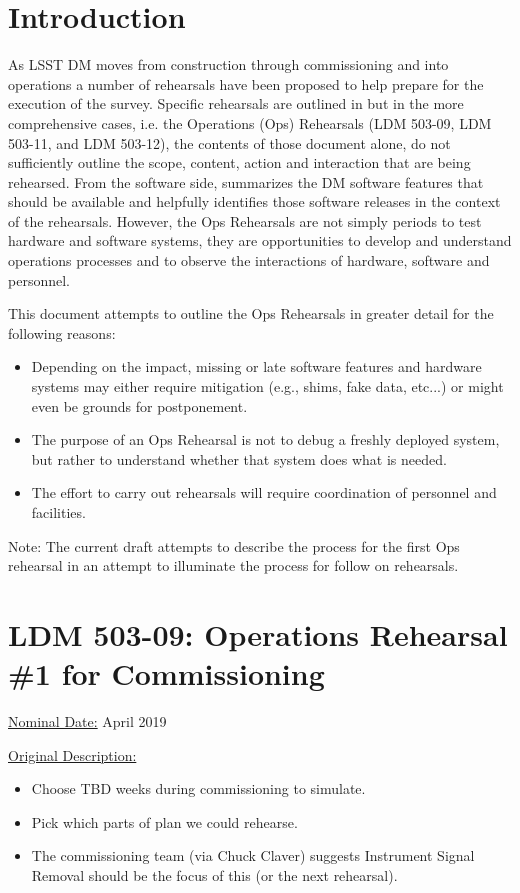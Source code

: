 
\section{Introduction}

As LSST DM moves from construction through commissioning and into operations 
a number of rehearsals have been proposed to help prepare for the execution 
of the survey.  Specific rehearsals are outlined in  but in 
the more comprehensive cases, i.e. the Operations (Ops) Rehearsals (LDM 503-09, LDM 503-11, and 
LDM 503-12), the contents of those document alone, do not sufficiently outline 
the scope, content, action and interaction that are being rehearsed.  
From the software side, 
summarizes the DM software features that should be available and helpfully 
identifies those software releases in the context of the rehearsals.  
However, the Ops Rehearsals are not simply periods to test hardware and 
software systems, they are opportunities to develop and understand operations 
processes and to observe the interactions of hardware, software and personnel.

This document attempts to outline the Ops Rehearsals in greater detail for the following reasons:
\begin{itemize}
\item Depending on the impact, missing or late software features and hardware systems may either
require mitigation (e.g., shims, fake data, etc...) or might even be grounds for 
postponement.
\item The purpose of an Ops Rehearsal is not to debug 
a freshly deployed system, but rather to understand whether that system does
what is needed.
\item The effort to carry out rehearsals will 
require coordination of personnel and facilities.
\end{itemize}

Note: The current draft attempts to describe the process for the first Ops 
rehearsal in an attempt to illuminate the process for follow on rehearsals.


\section{LDM 503-09: Operations Rehearsal \#1 for Commissioning}

\underline{Nominal Date:} April 2019

\underline{Original Description:}
\begin{itemize}
\item Choose TBD weeks during commissioning to simulate.
\item Pick which parts of plan we could rehearse.
\item The commissioning team (via Chuck Claver) suggests Instrument Signal Removal should be the focus 
of this (or the next rehearsal).
\end{itemize}

